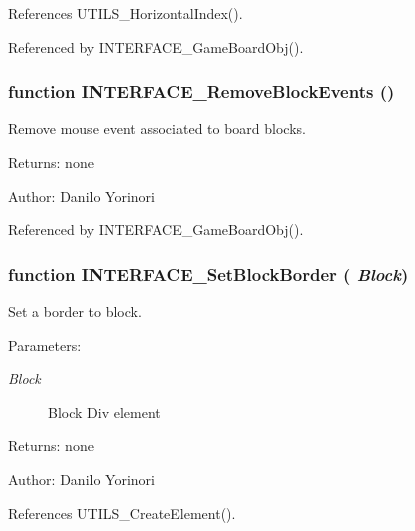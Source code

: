 References UTILS\_\-HorizontalIndex().

Referenced by INTERFACE\_\-GameBoardObj().
\subsubsection[INTERFACE\_\-RemoveBlockEvents]{\setlength{\rightskip}{0pt plus 5cm}function INTERFACE\_\-RemoveBlockEvents ()}\label{board_8js_7993b78a99ddb46b8e00fc831f7164b4}


Remove mouse event associated to board blocks. 

\begin{Desc}
\item[Returns:]none \end{Desc}
\begin{Desc}
\item[Author:]Danilo Yorinori \end{Desc}


Referenced by INTERFACE\_\-GameBoardObj().
\subsubsection[INTERFACE\_\-SetBlockBorder]{\setlength{\rightskip}{0pt plus 5cm}function INTERFACE\_\-SetBlockBorder ( {\em Block})}\label{board_8js_9f89df5c7f7a5fb62270ad7d758e423c}


Set a border to block. 

\begin{Desc}
\item[Parameters:]
\begin{description}
\item[{\em Block}]Block Div element \end{description}
\end{Desc}
\begin{Desc}
\item[Returns:]none \end{Desc}
\begin{Desc}
\item[Author:]Danilo Yorinori \end{Desc}


References UTILS\_\-CreateElement().

